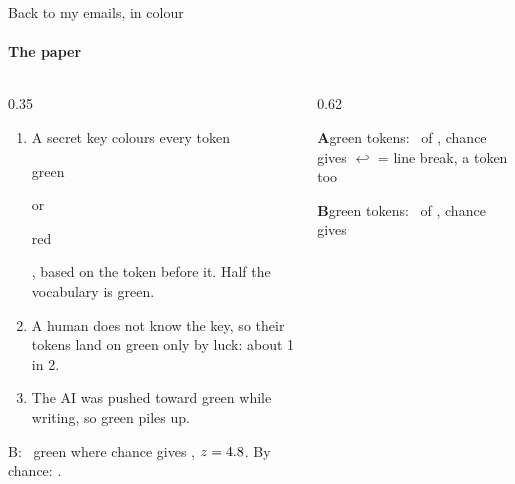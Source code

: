 \documentclass[aspectratio=169,10pt,t]{beamer}
\newcommand{\key}[1]{\textcolor{calblue}{\textbf{#1}}}
\newcommand{\quiet}[1]{\textcolor{muted}{#1}}
\newcommand{\gtok}[1]{{\setlength{\fboxsep}{0.8pt}\colorbox{good!16}{\strut\textcolor{good!70!black}{#1}}}}
\newcommand{\rtok}[1]{{\setlength{\fboxsep}{0.8pt}\colorbox{signal!13}{\strut\textcolor{signal!80!black}{#1}}}}
\begin{document}
\begin{frame}{Back to my emails, in colour}
  \framesubtitle{The paper}
  \begin{columns}[T,onlytextwidth]
    \begin{column}{0.35\textwidth}
      \raggedright\small
      \begin{enumerate}
        \item A secret key colours every token \gtok{green} or \rtok{red}, based on the token before it. Half the vocabulary is green.
        \item A human does not know the key, so their tokens land on green only by luck: about 1 in 2.
        \item The AI was pushed toward green while writing, so green piles up.
      \end{enumerate}
      \vspace{0.2em}
      \begin{goldbox}
        \raggedright B: \emailAIGreen\ green where chance gives \emailAIExpected, $z = 4.8$. By chance: \emailAIOdds.
      \end{goldbox}
    \end{column}
    \begin{column}{0.62\textwidth}
      \begin{tcolorbox}[enhanced,sharp corners,boxrule=0.4pt,colframe=muted!35,colback=white,borderline west={3pt}{0pt}{calblue},left=7pt,right=7pt,top=3pt,bottom=3pt,before skip=0pt,after skip=4pt]
        {\footnotesize\key{A}\quad green tokens: \emailHumanGreen\ of \emailHumanTokens, chance gives \emailHumanExpected\hfill{\scriptsize\quiet{$\hookleftarrow$ = line break, a token too}}}\par\vspace{0.15em}
        {\scriptsize\raggedright\emailHumanColor\par}
      \end{tcolorbox}
      \begin{tcolorbox}[enhanced,sharp corners,boxrule=0.4pt,colframe=muted!35,colback=white,borderline west={3pt}{0pt}{calblue},left=7pt,right=7pt,top=3pt,bottom=3pt,before skip=0pt,after skip=3pt]
        {\footnotesize\key{B}\quad green tokens: \emailAIGreen\ of \emailAITokens, chance gives \emailAIExpected}\par\vspace{0.15em}
        {\scriptsize\raggedright\emailAIColor\par}
      \end{tcolorbox}

\end{column}
\end{columns}
\end{frame}
\end{document}

